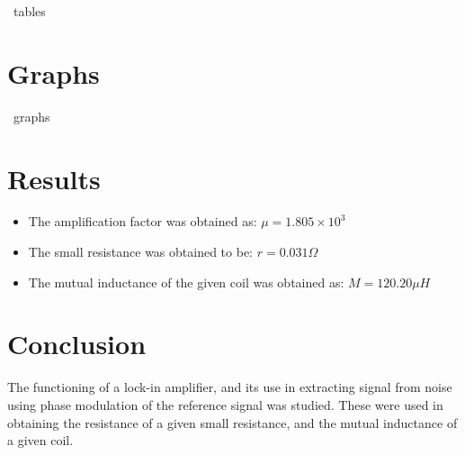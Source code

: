 \documentclass[a4paper]{article}
\providecommand{\tightlist}{%
\setlength{\itemsep}{0pt}\setlength{\parskip}{0pt}}
\begin{document}
~tables~

\hypertarget{graphs}{%
\section{Graphs}\label{graphs}}

~graphs~

\hypertarget{results}{%
\section{Results}\label{results}}

\begin{itemize}
\tightlist
\item
The amplification factor was obtained as: \(\mu = 1.805 \times 10^3\)
\item
The small resistance was obtained to be: \(r =0.031\Omega\)
\item
The mutual inductance of the given coil was obtained as:
\(M = 120.20 \mu H\)
\end{itemize}

\hypertarget{conclusion}{%
\section{Conclusion}\label{conclusion}}

The functioning of a lock-in amplifier, and its use in extracting signal
from noise using phase modulation of the reference signal was studied.
These were used in obtaining the resistance of a given small resistance,
and the mutual inductance of a given coil.
\end{document}
